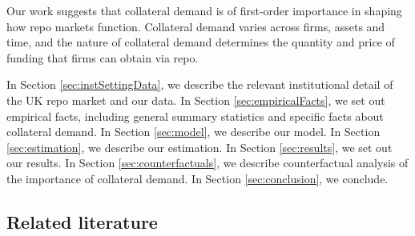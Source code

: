 Our work suggests that collateral demand is of first-order importance in shaping how repo markets function. Collateral demand varies across firms, assets and time, and the nature of collateral demand determines the quantity and price of funding that firms can obtain via repo. 

In Section \ref{sec:instSettingData}, we describe the relevant institutional detail of the UK repo market and our data. In Section \ref{sec:empiricalFacts}, we set out empirical facts, including general summary statistics and specific facts about collateral demand. In Section \ref{sec:model}, we describe our model. In Section \ref{sec:estimation}, we describe our estimation. In Section \ref{sec:results}, we set out our results. In Section \ref{sec:counterfactuals}, we describe counterfactual analysis of the importance of collateral demand. In Section \ref{sec:conclusion}, we conclude.


\subsection{Related literature}


